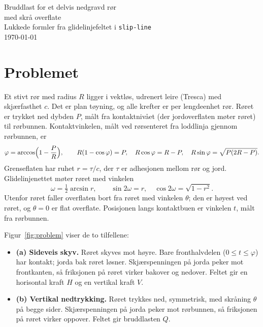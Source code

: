 \documentclass[11pt,a4paper]{article}
\begin{document}
\begin{center}
  {\LARGE Bruddlast for et delvis nedgravd rør\\[2pt] med skrå overflate}\\[8pt]
  {\large Lukkede formler fra glidelinjefeltet i \texttt{slip-line}}\\[6pt]
  \today
\end{center}

\section{Problemet}

Et stivt rør med radius $R$ ligger i vektløs, udrenert leire (Tresca) med
skjærfasthet $c$.  Det er plan tøyning, og alle krefter er per lengdeenhet
rør.  Røret er trykket ned dybden $P$, målt fra kontaktnivået (der
jordoverflaten møter røret) til rørbunnen.  Kontaktvinkelen, målt ved
rørsenteret fra loddlinja gjennom rørbunnen, er
\begin{equation}
  \varphi = \arccos\Bigl(1 - \frac{P}{R}\Bigr),
  \qquad
  R(1-\cos\varphi) = P,\quad
  R\cos\varphi = R - P,\quad
  R\sin\varphi = \sqrt{P(2R-P)} .
\end{equation}
Grenseflaten har ruhet $r = \tau/c$, der $\tau$ er adhesjonen mellom rør og
jord.  Glidelinjenettet møter røret med vinkelen
\begin{equation}
  \omega = \tfrac12 \arcsin r,
  \qquad
  \sin 2\omega = r,\quad
  \cos 2\omega = \sqrt{1-r^2} .
\end{equation}
Utenfor røret faller overflaten bort fra røret med vinkelen $\theta$; den
er høyest ved røret, og $\theta = 0$ er flat overflate.  Posisjonen langs
kontaktbuen er vinkelen $t$, målt fra rørbunnen.

Figur~\ref{fig:problem} viser de to tilfellene:
\begin{itemize}
  \item \textbf{(a) Sideveis skyv.}  Røret skyves mot høyre.  Bare
        fronthalvdelen ($0 \le t \le \varphi$) har kontakt; jorda bak røret
        løsner.  Skjærspenningen på jorda peker mot frontkanten, så
        friksjonen på røret virker bakover og nedover.  Feltet gir en
        horisontal kraft $H$ og en vertikal kraft $V$.
  \item \textbf{(b) Vertikal nedtrykking.}  Røret trykkes ned, symmetrisk,
        med skråning $\theta$ på begge sider.  Skjærspenningen på jorda
        peker mot rørbunnen, så friksjonen på røret virker oppover.  Feltet
        gir bruddlasten $Q$.
\end{itemize}
\end{document}

